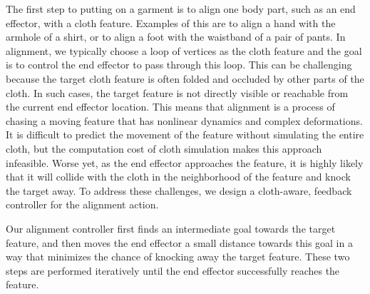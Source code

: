 The first step to putting on a garment is to align one body part, such as an end effector, with a cloth feature. Examples of this are to align a hand with the armhole of a shirt, or to align a foot with the waistband of a pair of pants. In alignment, we typically choose a loop of vertices as the cloth feature and the goal is to control the end effector to pass through this loop. This can be challenging because the target cloth feature is often folded and occluded by other parts of the cloth. In such cases, the target feature is not directly visible or reachable from the current end effector location. This means that alignment is a process of chasing a moving feature that has nonlinear dynamics and complex deformations. It is difficult to predict the movement of the feature without simulating the entire cloth, but the computation cost of cloth simulation makes this approach infeasible. Worse yet, as the end effector approaches the feature, it is highly likely that it will collide with the cloth in the neighborhood of the feature and knock the target away.  To address these challenges, we design a cloth-aware, feedback controller for the alignment action.

Our alignment controller first finds an intermediate goal towards the target feature, and then moves the end effector a small distance towards this goal in a way that minimizes the chance of knocking away the target feature. These two steps are performed iteratively until the end effector successfully reaches the feature. 



